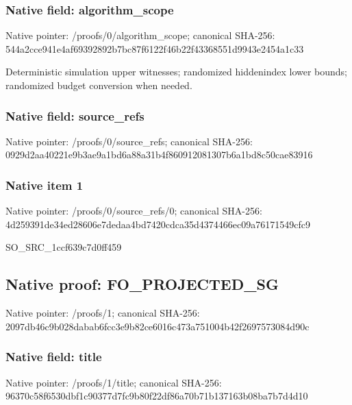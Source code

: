 \documentclass[10pt,a4paper]{article}
\begin{document}
\subsubsection{Native field: algorithm\_scope}


Native pointer: /proofs/0/algorithm\_scope; canonical SHA-256: 544a2cce941e4af69392892b\allowbreak{}7bc87f6122f46b22f4336855\allowbreak{}1d9943e2454a1c33


Deterministic simulation upper witnesses; randomized hiddenindex lower bounds; randomized budget conversion when needed.


\subsubsection{Native field: source\_refs}


Native pointer: /proofs/0/source\_refs; canonical SHA-256: 0929d2aa40221e9b3ae9a1bd\allowbreak{}6a88a31b4f860912081307b6\allowbreak{}a1bd8c50cae83916



\subsubsection{Native item 1}


Native pointer: /proofs/0/source\_refs/0; canonical SHA-256: 4d259391de34ed28606e7ded\allowbreak{}aa4bd7420cdca35d4374466e\allowbreak{}c09a76171549cfc9


SO\_SRC\_1ccf639c7d0ff459


\subsection{Native proof: FO\_PROJECTED\_SG}


Native pointer: /proofs/1; canonical SHA-256: 2097db46c9b028dabab6fcc3\allowbreak{}e9b82ce6016c473a751004b4\allowbreak{}2f2697573084d90c



\subsubsection{Native field: title}


Native pointer: /proofs/1/title; canonical SHA-256: 96370c58f6530dbf1c90377d\allowbreak{}7fc9b80f22df86a70b71b137\allowbreak{}163b08ba7b7d4d10
\end{document}
